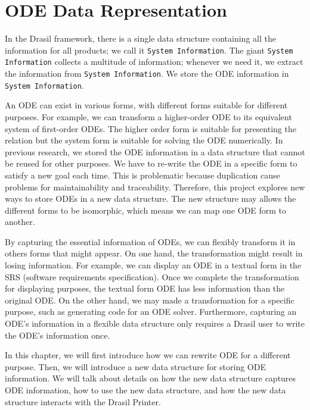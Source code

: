 \chapter{ODE Data Representation}
In the Drasil framework, there is a single data structure containing all the information for all products; we call it \verb|System Information|. The giant \verb|System Information| collects a multitude of information; whenever we need it, we extract the information from \verb|System Information|. We store the ODE information in \verb|System Information|. 

An ODE can exist in various forms, with different forms suitable for different purposes. For example, we can transform a higher-order ODE to its equivalent system of first-order ODEs. The higher order form is suitable for presenting the relation but the system form is suitable for solving the ODE numerically. In previous research, we stored the ODE information in a data structure that cannot be reused for other purposes. We have to re-write the ODE in a specific form to satisfy a new goal each time. This is problematic because duplication cause problems for maintainability and traceability. Therefore, this project explores new ways to store ODEs in a new data structure. The new structure may allows the different forms to be isomorphic, which means we can map one ODE form to another. 

By capturing the essential information of ODEs, we can flexibly transform it in others forms that might appear. On one hand, the transformation might result in losing information. For example, we can display an ODE in a textual form in the SRS (software requirements specification). Once we complete the transformation for displaying purposes, the textual form ODE has less information than the original ODE. On the other hand, we may made a transformation for a specific purpose, such as generating code for an ODE solver. Furthermore, capturing an ODE's information in a flexible data structure only requires a Drasil user to write the ODE's information once.

In this chapter, we will first introduce how we can rewrite ODE for a different purpose. Then, we will introduce a new data structure for storing ODE information. We will talk about details on how the new data structure captures ODE information, how to use the new data structure, and how the new data structure interacts with the Drasil Printer.

